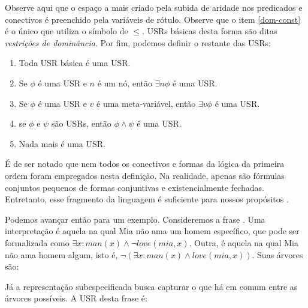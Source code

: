 Observe aqui que o espaço a mais criado pela subida de aridade nos predicados e conectivos é preenchido pela variáveis de rótulo. Observe que o item \ref{dom-const} é o único que utiliza o símbolo de $\leq$. USRs básicas desta forma são ditas \textit{restrições de dominância}. Por fim, podemos definir o restante das USRs:

\begin{enumerate}
\item Toda USR básica é uma USR.
\item Se $\phi$ é uma USR e $n$ é um nó, então $\exists n \phi$ é uma USR.
\item Se $\phi$ é uma USR e $v$ é uma meta-variável, então $\exists v \phi$ é uma USR.
\item se $\phi$ e $\psi$ são USRs, então $\phi \land \psi$ é uma USR.
\item Nada mais é uma USR.
\end{enumerate}

É de ser notado que nem todos os conectivos e formas da lógica da primeira ordem foram empregados nesta definição. Na realidade, apenas são fórmulas conjuntos pequenos de formas conjuntivas e existencialmente fechadas. Entretanto, esse fragmento da linguagem é suficiente para nossos propósitos \citep[p.~131]{BlackburnBos:2005}.

Podemos avançar então para um exemplo. Consideremos a frase . Uma interpretação é aquela na qual Mia não ama um homem específico, que pode ser formalizada como $\exists x: man(x) \land \neg love(mia,x)$. Outra, é aquela na qual Mia não ama homem algum, isto é, $\neg (\exists x: man(x) \land love(mia,x))$. Suas árvores são:

\begin{center}
\end{center}

Já a representação subespecificada busca capturar o que há em comum entre as árvores possíveis. A USR desta frase é: 

